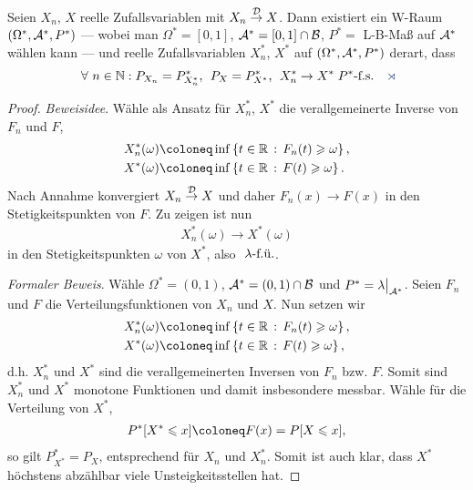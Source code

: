 \begin{prop}
\label{prop:9.5}
Seien $X_{n}$, $X$ reelle Zufallsvariablen mit $X_{n}\Dto X$. Dann existiert
ein W-Raum $(\Omega ^ {\ast}, {\AA}^ {\ast}, P^ {\ast})$ --- wobei man 
$\Omega^{\ast} = [0,1]$, ${\AA}^ {\ast} = [0,1] \cap {\cal B}$, $P^ {\ast} = $
L-B-Maß auf ${\AA}^ {\ast}$ wählen kann --- und reelle Zufallsvariablen 
$X^{\ast}_{n}$, $X^{\ast}$ auf $(\Omega ^ {\ast}, {\AA}^ {\ast}, P^ {\ast})$ derart, dass
\begin{align*}
\forall n\in\N : P_{X_{n}} =P^*_{X^ {\ast}_{n}},\;\, P_{X} =
P^*_{X^ {\ast}},\,\; X^ {\ast}_{n} \to X^ {\ast}\;
P^{\ast}\mbox{-f.s.}\fishhere
\end{align*}
\end{prop}
\begin{proof}
\textit{Beweisidee}. Wähle als Ansatz für $X_n^*$, $X^*$ die verallgemeinerte
Inverse von $F_n$ und $F$,
\begin{align*}
&X_n^*(\omega) \defl \inf\setdef{t\in\R}{F_n(t)\ge \omega},\\
&X^*(\omega) \defl\inf\setdef{t\in\R}{F(t)\ge \omega}.
\end{align*}
Nach Annahme konvergiert $X_n\Dto X$ und daher $F_n(x)\to F(x)$ in den
Stetigkeitspunkten von $F$. Zu zeigen ist nun
\begin{align*}
X_n^*(\omega) \to X^*(\omega)
\end{align*}
in den Stetigkeitspunkten $\omega$ von $X^*$, also $\fu{\lambda}$.

\textit{Formaler Beweis}. Wähle $\Omega^*=(0,1)$, $\AA^*=(0,1)\cap \BB$ und
$P^*=\lambda\big|_{\AA^*}$. Seien $F_n$ und $F$ die Verteilungsfunktionen von
$X_n$ und $X$. Nun setzen wir
\begin{align*}
&X_n^*(\omega) \defl \inf\setdef{t\in\R}{F_n(t)\ge \omega},\\
&X^*(\omega) \defl\inf\setdef{t\in\R}{F(t)\ge \omega},
\end{align*}
d.h. $X_n^*$ und $X^*$ sind die verallgemeinerten Inversen von $F_n$ bzw. $F$.
Somit sind $X_n^*$ und $X^*$ monotone Funktionen und damit insbesondere messbar.
Wähle für die Verteilung von $X^*$,
\begin{align*}
P^*[X^*\le x] \defl F(x) = P[X\le x],
\end{align*}
so gilt $P^*_{X^*} = P_X$, entsprechend für $X_n$ und $X_n^*$. Somit ist
auch klar, dass $X^*$ höchstens abzählbar viele Unsteigkeitsstellen hat.


\end{proof}
